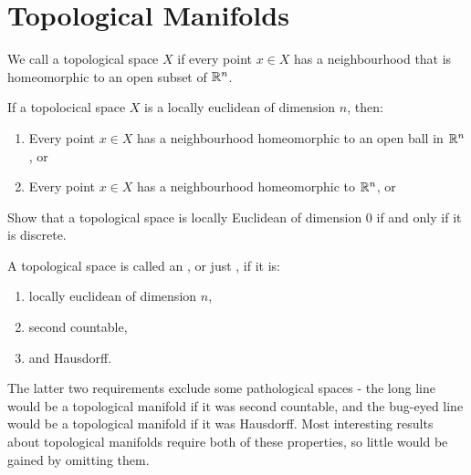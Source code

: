 \chapter{Topological Manifolds}
\begin{importantdefinition}{}{}
	We call a topological space $X$  if every point $x \in X$ has a neighbourhood that is homeomorphic to an open subset of $\mathbb{R}^n$.
\end{importantdefinition}
\begin{exercise}
	If a topolocical space $X$ is a locally euclidean of dimension $n$, then:
	\begin{enumerate}
		\item Every point $x \in X$ has a neighbourhood homeomorphic to an open ball in $\mathbb{R}^n$, or
		\item Every point $x \in X$ has a neighbourhood homeomorphic to $\mathbb{R}^n$, or
	\end{enumerate}
\end{exercise}
\begin{exercise}
	Show that a topological space is locally Euclidean of dimension $0$ if and only if it is discrete.
\end{exercise}
\begin{importantdefinition}{}{}
	A topological space is called an , or just , if it is:
	\begin{enumerate}
		\item locally euclidean of dimension $n$,
		\item second countable,
		\item and Hausdorff.
	\end{enumerate}
\end{importantdefinition}
The latter two requirements exclude some pathological spaces - the long line would be a topological manifold if it was second countable, and the bug-eyed line would be a topological manifold if it was Hausdorff. Most interesting results about topological manifolds require both of these properties, so little would be gained by omitting them.

